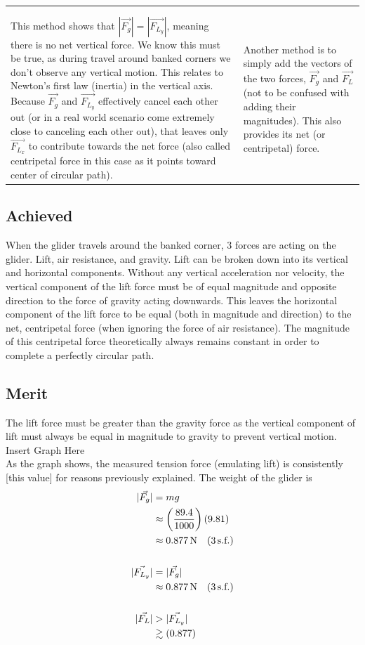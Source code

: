 \documentclass[11pt, a4paper]{article}
\begin{document}
\begin{table}[H]
\begin{tabularx}{\textwidth}{X|X}
{\begin{align}
				\end{align}
			}\\
			This method shows that $|\vec{F_g}|=|\vec{F_{L_y}}|$, meaning there is no net vertical force. We know this must be true, as during travel around banked corners we don't observe any vertical motion. This relates to Newton's first law (inertia) in the vertical axis.
			Because $\vec{F_g}$ and $\vec{F_{L_y}}$ effectively cancel each other out (or in a real world scenario come extremely close to canceling each other out), that leaves only $\vec{F_{L_x}}$ to contribute towards the net force (also called centripetal force in this case as it points toward center of circular path).
			&
			Another method is to simply add the vectors of the two forces, $\vec{F_g}$ and $\vec{F_L}$ (not to be confused with adding their magnitudes). This also provides its net (or centripetal) force.\\
		\end{tabularx}
	\end{table}
	
	\subsection{Achieved}
	
	When the glider travels around the banked corner, 3 forces are acting on the glider. Lift, air resistance, and gravity. Lift can be broken down into its vertical and horizontal components. Without any vertical acceleration nor velocity, the vertical component of the lift force must be of equal magnitude and opposite direction to the force of gravity acting downwards. This leaves the horizontal component of the lift force to be equal (both in magnitude and direction) to the net, centripetal force (when ignoring the force of air resistance). The magnitude of this centripetal force theoretically always remains constant in order to complete a perfectly circular path.
	\subsection{Merit}
	The lift force must be greater than the gravity force as the vertical component of lift must always be equal in magnitude to gravity to prevent vertical motion.\\
	Insert Graph Here\\
	As the graph shows, the measured tension force (emulating lift) is consistently [this value] for reasons previously explained.
	The weight of the glider is
	\begin{align}
		|\vec{F_g}|&=mg\\
		&\approx \left(\frac{89.4}{1000}\right)(9.81)\\
		&\approx \SI{0.877}{\newton} \quad (3\, \text{s.f.})\\[\baselineskip]
		|\vec{F_{L_y}}|&=|\vec{F_g}|\\
		&\approx \SI{0.877}{\newton} \quad (3\, \text{s.f.})\\[\baselineskip]
		|\vec{F_L}|&>|\vec{F_{L_y}}|\\
		&\gtrsim(0.877)
	\end{align}
	
\end{document}
